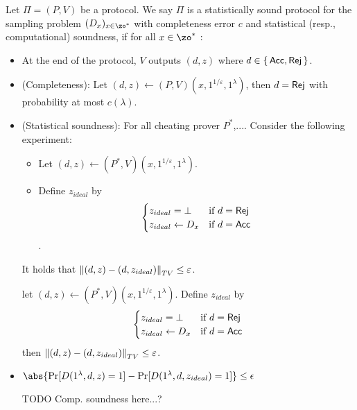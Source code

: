 \begin{definition}
	\label{dfn:stats-secure-proto-sampbqp}
	Let  $\Pi=(P, V)$ be a protocol.
	We say $\Pi$ is a statistically sound protocol for the sampling problem $(D_x)_{x\in\zo^*}$ with completeness error $c$ and statistical (resp., computational) soundness, if for all $x\in\zo^*$ :
	\begin{itemize}
		\item At the end of the protocol, $V$ outputs $(d, z)$ where $d\in\set{\mathsf{Acc}, \mathsf{Rej}}$. 
		\item (Completeness): Let $(d, z)\leftarrow(P, V)(x, 1^{1/\varepsilon}, 1^\lambda)$, then $d=\mathsf{Rej}$ with probability at most $c(\lambda)$.
		\item (Statistical soundness): For all cheating prover $P^*$,....    Consider the following experiment:
		\begin{itemize}
		    \item Let $(d, z)\leftarrow(P^*, V)(x, 1^{1/\varepsilon}, 1^\lambda)$.
		    \item Define $z_{ideal}$ by
			$$\begin{cases}
				z_{ideal}=\bot & \text{if } d=\mathsf{Rej}\\
				z_{ideal}\leftarrow D_x & \text{if } d=\mathsf{Acc}
			\end{cases}$$.
		\end{itemize}
		It holds that $\left\lVert(d,z)-(d,z_{ideal})\right\rVert_{TV}\leq\varepsilon$. 
		
		
		let $(d, z)\leftarrow(P^*, V)(x, 1^{1/\varepsilon}, 1^\lambda)$.
			Define $z_{ideal}$ by
			$$\begin{cases}
				z_{ideal}=\bot & \text{if } d=\mathsf{Rej}\\
				z_{ideal}\leftarrow D_x & \text{if } d=\mathsf{Acc}
			\end{cases}$$
			then $\left\lVert(d,z)-(d,z_{ideal})\right\rVert_{TV}\leq\varepsilon$.
		\item {}
		$ \abs{\Pr[D(1^{\lambda}, d,z) = 1] - \Pr[D(1^{\lambda}, d,z_{ideal}) = 1]} \leq \eps $
		
		TODO Comp. soundness here...?
	\end{itemize}
\end{definition}


